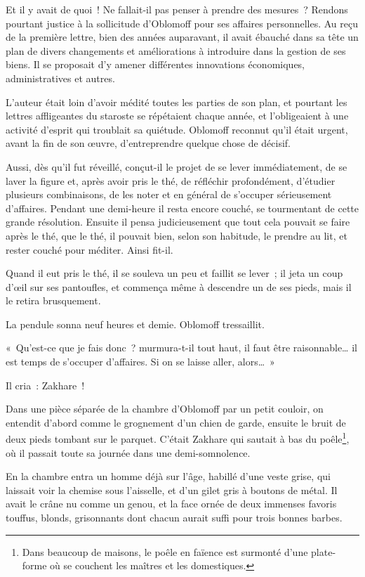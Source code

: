\documentclass[french,twoside]{book} %
\begin{document}
Et il y avait de quoi ! Ne fallait-il pas penser à prendre des mesures ? Rendons pourtant justice à la sollicitude d’Oblomoff pour ses affaires personnelles. Au reçu de la première lettre, bien des années auparavant, il avait ébauché dans sa tête un plan de divers changements et améliorations à introduire dans la gestion de ses biens. Il se proposait d’y amener différentes innovations économiques, administratives et autres.\par
L’auteur était loin d’avoir médité toutes les parties de son plan, et pourtant les lettres affligeantes du staroste se répétaient chaque année, et l’obligeaient à une activité d’esprit qui troublait sa quiétude. Oblomoff reconnut qu’il était urgent, avant la fin de son œuvre, d’entreprendre quelque chose de décisif.\par
Aussi, dès qu’il fut réveillé, conçut-il le projet de se lever immédiatement, de se laver la figure et, après avoir pris le thé, de réfléchir profondément, d’étudier plusieurs combinaisons, de les noter et en général de s’occuper sérieusement d’affaires. Pendant une demi-heure il resta encore couché, se tourmentant de cette grande résolution. Ensuite il pensa judicieusement que tout cela pouvait se faire après le thé, que le thé, il pouvait bien, selon son habitude, le prendre au lit, et rester couché pour méditer. Ainsi fit-il.\par
Quand il eut pris le thé, il se souleva un peu et faillit se lever ; il jeta un coup d’œil sur ses pantoufles, et commença même à descendre un de ses pieds, mais il le retira brusquement.\par
La pendule sonna neuf heures et demie. Oblomoff tressaillit.\par
« Qu’est-ce que je fais donc ? murmura-t-il tout haut, il faut être raisonnable… il est temps de s’occuper d’affaires. Si on se laisse aller, alors… »\par
Il cria : Zakhare !\par
Dans une pièce séparée de la chambre d’Oblomoff par un petit couloir, on entendit d’abord comme le grognement d’un chien de garde, ensuite le bruit de deux pieds tombant sur le parquet. C’était Zakhare qui sautait à bas du poêle\footnote{Dans beaucoup de maisons, le poêle en faïence est surmonté d’une plate-forme où se couchent les maîtres et les domestiques.}, où il passait toute sa journée dans une demi-somnolence.\par
En la chambre entra un homme déjà sur l’âge, habillé d’une veste grise, qui laissait voir la chemise sous l’aisselle, et d’un gilet gris à boutons de métal. Il avait le crâne nu comme un genou, et la face ornée de deux immenses favoris touffus, blonds, grisonnants dont chacun aurait suffi pour trois bonnes barbes.\par
\end{document}
